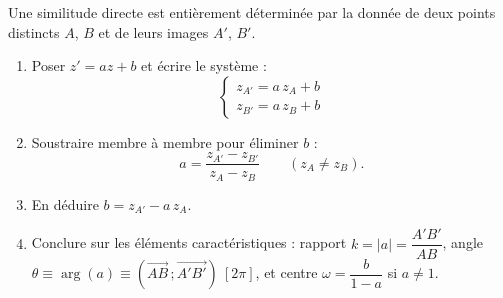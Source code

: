 \documentclass[11pt]{article}
\begin{document}
\begin{methode}[Similitude définie par $s(A) = A'$ et $s(B) = B'$]
Une similitude directe est entièrement déterminée par la donnée de deux points distincts $A$, $B$ et de leurs images $A'$, $B'$.
\begin{enumerate}
\item Poser $z' = az + b$ et écrire le système :
\[ \begin{cases} z_{A'} = a\,z_A + b \\ z_{B'} = a\,z_B + b \end{cases} \]
\item Soustraire membre à membre pour éliminer $b$ :
\[ a = \frac{z_{A'} - z_{B'}}{z_A - z_B} \qquad (z_A \neq z_B). \]
\item En déduire $b = z_{A'} - a\,z_A$.
\item Conclure sur les éléments caractéristiques : rapport $k = |a| = \dfrac{A'B'}{AB}$, angle $\theta \equiv \arg(a) \equiv \left(\overrightarrow{AB}\,;\overrightarrow{A'B'}\right)\ [2\pi]$, et centre $\omega = \dfrac{b}{1-a}$ si $a \neq 1$.
\end{enumerate}
\end{methode}
\end{document}
